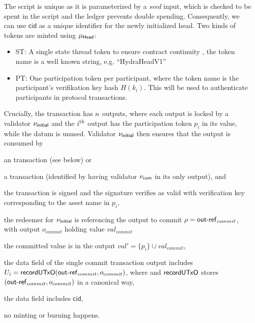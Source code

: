 The script is unique as it is parameterized by a \emph{seed} input, which is
checked to be spent in the script  and the ledger
prevents double spending. Consequently, we can use $\mathsf{cid}$ as a unique
identifier for the newly initialized head. Two kinds of tokens are minted using
$\mu_\mathsf{Head}$:
\begin{itemize}
\item ST: A single state thread token to ensure contract continuity , the token name is a well known string, e.g. “HydraHeadV1”
\item PT: One participation token per participant, where the token name is the participant's verifikation key hash $H(k_i)$. This will be used to authenticate participants in protocol transactions.
\end{itemize}


Crucially, the \mtxInit{} transaction has $n$ outputs, where each output is
locked by a validator $\nu_\mathsf{initial}$ and the $i^{\text{th}}$ output has the participation
token $p_i$ in its value, while the datum is unused. Validator $\nu_\mathsf{initial}$
then ensures that the output is consumed by

\begin{menumerate}
  \item an \mtxAbort{} transaction (see below) or
  \item a \mtxCom{} transaction (identified by having validator $\nu_\mathsf{com}$ in its
  only output), and
  \begin{menumerate}
    \item the transaction is signed and the signature verifies as valid with
    verification key corresponding to the asset name in $p_i$,
    \item the redeemer for $\nu_\mathsf{initial}$ is referencing the output to commit $ \rho = \mathsf{out\textsf{-}{}ref}_{commit}$, with output $o_{commit}$ holding value $val_{commit}$
    \item the committed value is in the output $val' = \{p_{i}\} \cup val_{commit} $,
    \item the data field of the single commit transaction output includes
    $U_i = \mathsf{recordUTxO}(\mathsf{out\textsf{-}{}ref}_{commit},o_{commit})$, where and $\mathsf{recordUTxO}$
    stores $(\mathsf{out\textsf{-}{}ref}_{commit},o_{commit})$ in a canonical way, 
    \item the data field includes $\mathsf{cid}$, 
    \item no minting or burning happens.
  \end{menumerate}
\end{menumerate}

